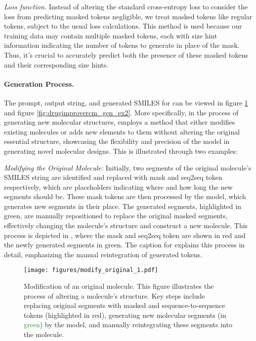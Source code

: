 \textit{Loss function.} 
Instead of altering the standard cross-entropy loss to consider the loss from predicting masked tokens negligible, we treat masked tokens like regular tokens, subject to the usual loss calculations. This method is used because our training data may contain multiple masked tokens, each with size hint information indicating the number of tokens to generate in place of the mask. Thus, it's crucial to accurately predict both the presence of these masked tokens and their corresponding size hints.


\paragraph{Generation Process.} The prompt, output string, and generated SMILES for \algname can be viewed in figure \ref{fig:drugimprovercm_gen_ex1} and figure \ref{fig:drugimprovercm_gen_ex2}. More specifically,
in the process of generating new molecular structures, \algname employs a method that either modifies existing molecules or adds new elements to them without altering the original essential structure, showcasing the flexibility and precision of the model in generating novel molecular designs. This is illustrated through two examples:

\textit{Modifying the Original Molecule:} Initially, two segments of the original molecule's SMILES string are identified and replaced with mask and seq2seq token respectively, which are placeholders indicating where and how long the new segments should be. 
These mask tokens are then processed by the model, which generates new segments in their place. The generated segments, highlighted in green, are manually repositioned to replace the original masked segments, effectively changing the molecule's structure and construct a new molecule. 
This process is depicted in , where the mask and seq2seq token are shown in red and the newly generated segments in green. 
The caption for  explains this process in detail, emphasizing the manual reintegration of generated tokens.

    \begin{figure}[!ht]
        \centering
    \texttt{[image: figures/modify\_original\_1.pdf]}
        \caption{Modification of an original molecule. This figure illustrates the process of altering a molecule's structure. Key steps include replacing original segments with masked and sequence-to-sequence tokens (highlighted in \textcolor{myred}{red}), generating new molecular segments (in \textcolor{ForestGreen}{green}) by the model, and manually reintegrating these segments into the molecule. }
        \label{fig:drugimprovercm_gen_ex1}
    \end{figure}


